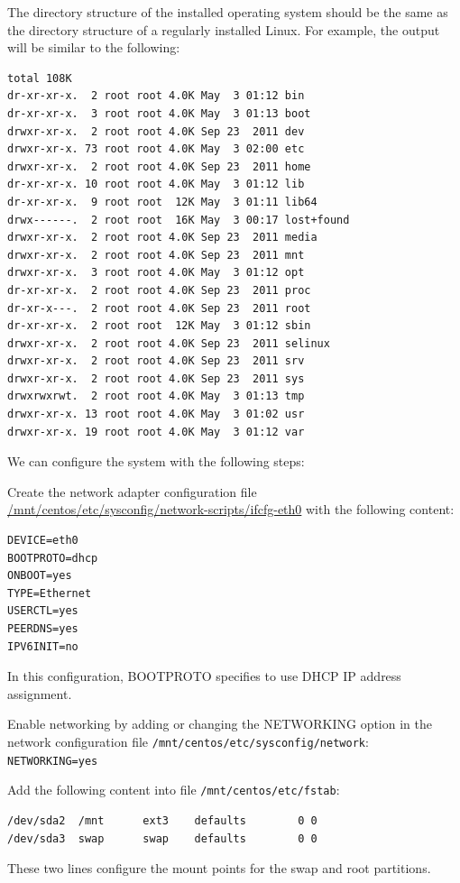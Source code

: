 The directory structure of the installed operating system should be the same as the directory structure of a regularly installed Linux. For example, the output will be similar to the following:
\lstset{style=bashstyle}
\begin{lstlisting}
total 108K
dr-xr-xr-x.  2 root root 4.0K May  3 01:12 bin
dr-xr-xr-x.  3 root root 4.0K May  3 01:13 boot
drwxr-xr-x.  2 root root 4.0K Sep 23  2011 dev
drwxr-xr-x. 73 root root 4.0K May  3 02:00 etc
drwxr-xr-x.  2 root root 4.0K Sep 23  2011 home
dr-xr-xr-x. 10 root root 4.0K May  3 01:12 lib
dr-xr-xr-x.  9 root root  12K May  3 01:11 lib64
drwx------.  2 root root  16K May  3 00:17 lost+found
drwxr-xr-x.  2 root root 4.0K Sep 23  2011 media
drwxr-xr-x.  2 root root 4.0K Sep 23  2011 mnt
drwxr-xr-x.  3 root root 4.0K May  3 01:12 opt
dr-xr-xr-x.  2 root root 4.0K Sep 23  2011 proc
dr-xr-x---.  2 root root 4.0K Sep 23  2011 root
dr-xr-xr-x.  2 root root  12K May  3 01:12 sbin
drwxr-xr-x.  2 root root 4.0K Sep 23  2011 selinux
drwxr-xr-x.  2 root root 4.0K Sep 23  2011 srv
drwxr-xr-x.  2 root root 4.0K Sep 23  2011 sys
drwxrwxrwt.  2 root root 4.0K May  3 01:13 tmp
drwxr-xr-x. 13 root root 4.0K May  3 01:02 usr
drwxr-xr-x. 19 root root 4.0K May  3 01:12 var
\end{lstlisting}

We can configure the system with the following steps:

Create the network adapter configuration file \url{/mnt/centos/etc/sysconfig/network-scripts/ifcfg-eth0} with the following content:
\lstset{style=bashstyle}
\begin{lstlisting}
DEVICE=eth0
BOOTPROTO=dhcp
ONBOOT=yes
TYPE=Ethernet
USERCTL=yes
PEERDNS=yes
IPV6INIT=no
\end{lstlisting}

In this configuration, BOOTPROTO specifies to use DHCP IP address assignment.

Enable networking by adding or changing the NETWORKING option in the network configuration file \verb|/mnt/centos/etc/sysconfig/network|:\\
\verb|NETWORKING=yes|

Add the following content into file \verb|/mnt/centos/etc/fstab|:
\lstset{style=bashstyle}
\begin{lstlisting}
/dev/sda2  /mnt      ext3    defaults        0 0
/dev/sda3  swap      swap    defaults        0 0
\end{lstlisting}

These two lines configure the mount points for the swap and root partitions.

